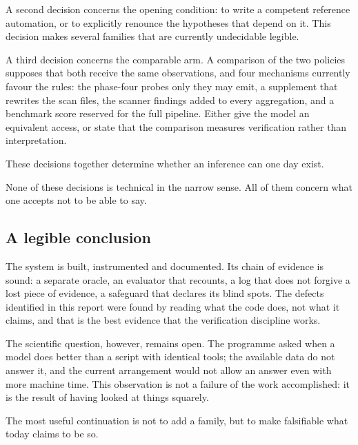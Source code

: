 A second decision concerns the opening condition: to write a competent reference automation, or to explicitly renounce the hypotheses that depend on it. This decision makes several families that are currently undecidable legible.

A third decision concerns the comparable arm. A comparison of the two policies supposes that both receive the same observations, and four mechanisms currently favour the rules: the phase-four probes only they may emit, a supplement that rewrites the scan files, the scanner findings added to every aggregation, and a benchmark score reserved for the full pipeline. Either give the model an equivalent access, or state that the comparison measures verification rather than interpretation.

These decisions together determine whether an inference can one day exist.

None of these decisions is technical in the narrow sense. All of them concern what one accepts not to be able to say.

\subsection{A legible conclusion}

The system is built, instrumented and documented. Its chain of evidence is sound: a separate oracle, an evaluator that recounts, a log that does not forgive a lost piece of evidence, a safeguard that declares its blind spots. The defects identified in this report were found by reading what the code does, not what it claims, and that is the best evidence that the verification discipline works.

The scientific question, however, remains open. The programme asked when a model does better than a script with identical tools; the available data do not answer it, and the current arrangement would not allow an answer even with more machine time. This observation is not a failure of the work accomplished: it is the result of having looked at things squarely.

The most useful continuation is not to add a family, but to make falsifiable what today claims to be so.
